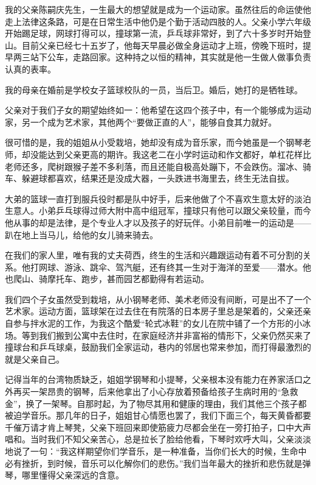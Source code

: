 \par 我的父亲陈嗣庆先生，一生最大的想望就是成为一个运动家。虽然往后的命运使他走上法律这条路，可是在日常生活中他仍是个勤于活动四肢的人。父亲小学六年级开始踢足球，网球打得可以，撞球第一流，乒乓球非常好，到了六十多岁时开始登山。目前父亲已经七十五岁了，他每天早晨必做全身运动才上班，傍晚下班时，提早两三站下公车，走路回家。这种持之以恒的精神，其实就是他一生做人做事负责认真的表率。
\par 我的母亲在婚前是学校女子篮球校队的一员，当后卫。婚后，她打的是牺牲球。
\par 父亲对于我们子女的期望始终如一：他希望在这四个孩子中，有一个能够成为运动家，另一个成为艺术家，其他两个“要做正直的人”，能够自食其力就好。
\par 很可惜的是，我的姐姐从小受栽培，她却没有成为音乐家，而今她虽是一个钢琴老师，却没能达到父亲更高的期许。我这老二在小学时运动和作文都好，单杠花样比老师还多，爬树跟猴子差不多利落，而且还能自极高处蹦下，不会跌伤。溜冰、骑车、躲避球都喜欢，结果还是没成大器，一头跌进书海里去，终生无法自拔。
\par 大弟的篮球一直打到服兵役时都是队中好手，后来他做了个不喜欢生意太好的淡泊生意人。小弟乒乓球得过师大附中高中组冠军，撞球只有他可以跟父亲较量，而今他从事的却是法律，是个专业人才以及孩子的好玩伴。小弟目前唯一的运动是——趴在地上当马儿，给他的女儿骑来骑去。
\par 在我们的家人里，唯有我的丈夫荷西，终生的生活和兴趣跟运动有着不可分割的关系。他打网球、游泳、跳伞、驾汽艇，还有终其一生对于海洋的至爱——潜水。他也爬山、骑摩托车、跑步，甚而园艺都勤得有若运动。
\par 我们四个子女虽然受到栽培，从小钢琴老师、美术老师没有间断，可是出不了一个艺术家。运动方面，篮球架在过去住在有院落的日本房子里总是架着的，父亲还亲自参与拌水泥的工作，为我这个酷爱“轮式冰鞋”的女儿在院中铺了一个方形的小冰场。等到我们搬到公寓中去住时，在家庭经济并非富裕的情形下，父亲仍然买来了撞球台和乒乓球桌，鼓励我们全家运动，巷内的邻居也常来参加，而打得最激烈的就是父亲自己。
\par 记得当年的台湾物质缺乏，姐姐学钢琴和小提琴，父亲根本没有能力在养家活口之外再买一架昂贵的钢琴，后来他拿出了小心存放着预备给孩子生病时用的“急救金”，换了一架琴。自那时起，为了物尽其用和健康的理由，我们其他三个孩子都被迫学音乐。那几年的日子，姐姐甘心情愿也罢了，我们下面三个，每天黄昏都要千催万请才肯上琴凳，父亲下班回来即使筋疲力尽都会坐在一旁打拍子，口中大声唱和。当时我们不知父亲苦心，总是拉长了脸给他看，下琴时欢呼大叫，父亲淡淡地说了一句：“我这样期望你们学音乐，是一种准备，当你们长大的时候，生命中必有挫折，到时候，音乐可以化解你们的悲伤。”我们当年最大的挫折和悲伤就是弹琴，哪里懂得父亲深远的含意。
